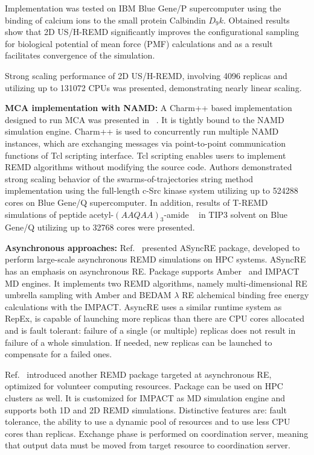 \documentclass{sig-alternate-05-2015}
\begin{document}
Implementation was tested on IBM Blue Gene/P supercomputer using the binding of calcium ions to the small protein Calbindin $D_9k$. Obtained results show that 2D US/H-REMD significantly improves the configurational sampling for biological potential of mean force (PMF) calculations and as a result facilitates convergence of the simulation.

Strong scaling performance of 2D US/H-REMD, involving 4096 replicas and utilizing up to 131072 CPUs was presented, demonstrating nearly linear scaling.

{\bf MCA implementation with NAMD:} A Charm++ based implementation designed to run MCA was presented in ~\cite{jiang2014}. It is tightly bound to the NAMD simulation engine. Charm++ is used to concurrently run multiple NAMD instances, which are exchanging messages via point-to-point communication functions of Tcl scripting interface. Tcl scripting enables users to implement REMD algorithms without modifying the source code.  Authors demonstrated strong scaling behavior of the swarms-of-trajectories string method implementation using the full-length c-Src kinase system utilizing up to 524288 cores on Blue Gene/Q supercomputer. In addition, results of T-REMD simulations of peptide acetyl-$(AAQAA)_3$-amide ~\cite{shalongo} in TIP3 solvent on Blue Gene/Q utilizing up to 32768 cores were presented.

{\bf Asynchronous approaches:} Ref.~\cite{2013-xsede-cdi,ct500776j} presented ASyncRE package, developed to perform large-scale asynchronous REMD simulations on HPC systems. ASyncRE has an emphasis on asynchronous RE. Package supports Amber~\cite{Amber} and IMPACT~\cite{impact2005} MD engines. It implements two REMD algorithms, namely multi-dimensional RE umbrella sampling with Amber and BEDAM $\lambda$ RE alchemical binding free energy calculations with the IMPACT. AsyncRE uses a similar runtime system as RepEx, is capable of launching more replicas than there are CPU cores allocated and is fault tolerant: failure of a single (or multiple) replicas does not result in failure of a whole simulation. If needed, new replicas can be launched to compensate for a failed ones.

Ref.~\cite{Xia_JComputChem_2015_v36_p1772} introduced another REMD package targeted at asynchronous RE, optimized for volunteer computing resources. Package can be used on HPC clusters as well. It is customized for IMPACT as MD simulation engine and supports both 1D and 2D REMD simulations.
Distinctive features are: fault tolerance, the ability to use a dynamic pool of resources and to use less CPU cores than replicas. Exchange phase is performed on coordination server, meaning that output data must be moved from target resource to coordination server.
\end{document}
